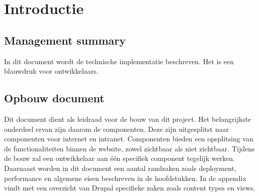 
\section{Introductie}

\subsection{Management summary}
In dit document wordt de technische implementatie beschreven. Het is een blauwdruk voor ontwikkelaars. 

\subsection{Opbouw document}
Dit document dient als leidraad voor de bouw van dit project. Het belangrijkste onderdeel ervan zijn daarom de componenten. Deze zijn uitgesplitst naar componenten voor internet en intranet.  Componenten bieden een opsplitsing van de functionaliteiten binnen de website, zowel zichtbaar als niet zichtbaar. Tijdens de bouw zal een ontwikkelaar aan \'{e}\'{e}n specifiek component tegelijk werken. Daarnaast worden in dit document een aantal randzaken zoals deployment, performance en algemene eisen beschreven in de hoofdstukken. In de appendix vindt met een overzicht van Drupal specifieke zaken zoals content types en views.
